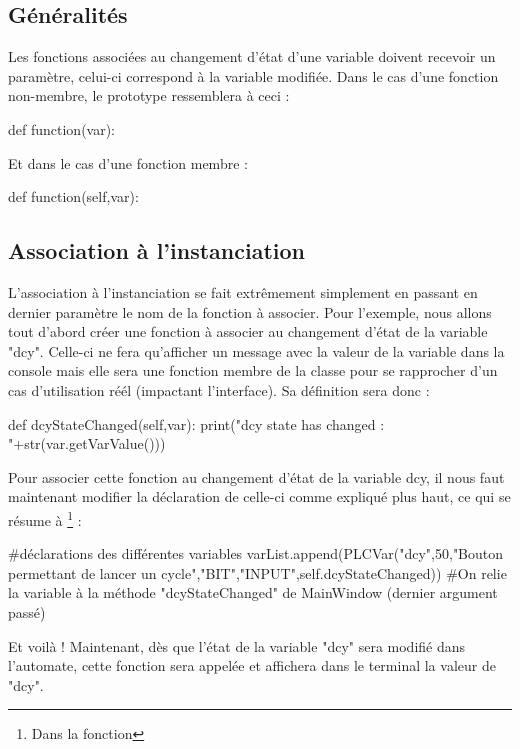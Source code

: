 {\subsection{Généralités}

Les fonctions associées au changement d'état d'une variable doivent recevoir un paramètre, celui-ci correspond à la variable modifiée.
Dans le cas d'une fonction non-membre, le prototype ressemblera à ceci :
\begin{Python}
def function(var):
\end{Python}
Et dans le cas d'une fonction membre :
\begin{Python}
def function(self,var):
\end{Python}

\subsection{Association à l'instanciation}

L'association à l'instanciation se fait extrêmement simplement en passant en dernier paramètre le nom de la fonction à associer.\newline
Pour l'exemple, nous allons tout d'abord créer une fonction à associer au changement d'état de la variable "dcy". Celle-ci ne fera qu'afficher un message avec la valeur de la variable dans la console mais elle sera une fonction membre de la classe  pour se rapprocher d'un cas d'utilisation réél (impactant l'interface).\newline
Sa définition sera donc :
\begin{Python}
def dcyStateChanged(self,var):
		print("dcy state has changed : "+str(var.getVarValue()))
\end{Python}

Pour associer cette fonction au changement d'état de la variable dcy, il nous faut maintenant modifier la déclaration de celle-ci comme expliqué plus haut, ce qui se résume à \footnote{Dans la fonction } :
\begin{Python}
#déclarations des différentes variables
varList.append(PLCVar("dcy",50,"Bouton permettant de lancer un cycle","BIT","INPUT",self.dcyStateChanged))
#On relie la variable à la méthode "dcyStateChanged" de MainWindow (dernier argument passé)
\end{Python}
 Et voilà ! Maintenant, dès que l'état de la variable "dcy" sera modifié dans l'automate, cette fonction sera appelée et affichera dans le terminal la valeur de "dcy".
 
}
